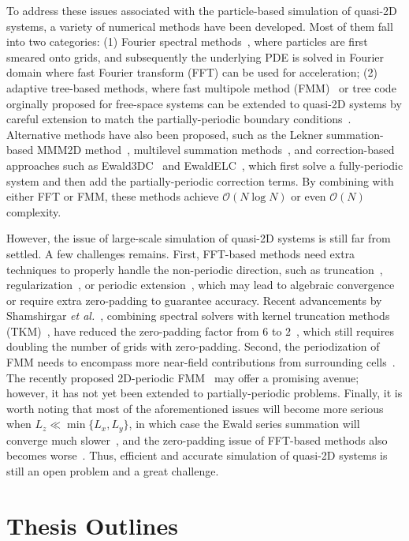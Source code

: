To address these issues associated with the particle-based simulation of quasi-2D systems, a variety of numerical methods have been developed.
Most of them fall into two categories: 
(1) Fourier spectral methods~\cite{lindbo2012fast,nestler2015fast,doi:10.1021/acs.jctc.3c01124, maxian2021fast}, where particles are first smeared onto grids, and subsequently the underlying PDE is solved in Fourier domain where fast Fourier transform (FFT) can be used for acceleration; 
(2) adaptive tree-based methods, where fast multipole method (FMM)~\cite{greengard1987fast} or tree code~\cite{Barnes1986Nature} orginally proposed for free-space systems can be extended to quasi-2D systems by careful extension to match the partially-periodic boundary conditions~\cite{yan2018flexibly,liang2020harmonic}. 
Alternative methods have also been proposed, such as the Lekner summation-based MMM2D method~\cite{arnold2002novel}, multilevel summation methods~\cite{doi:10.1021/ct5009075,greengard2023dual}, and correction-based approaches such as Ewald3DC~\cite{yeh1999ewald} and EwaldELC~\cite{arnold2002electrostatics}, which first solve a fully-periodic system and then add the partially-periodic correction terms. 
By combining with either FFT or FMM, these methods achieve $\mathcal{O}(N\log N)$ or even $\mathcal{O}(N)$ complexity. 

However, the issue of large-scale simulation of quasi-2D systems is still far from settled.
A few challenges remains. First, FFT-based methods need extra techniques to properly handle the non-periodic direction, such as truncation~\cite{parry1975electrostatic}, regularization~\cite{nestler2015fast}, or periodic extension~\cite{lindbo2012fast}, which may lead to algebraic convergence or require extra zero-padding to guarantee accuracy. 
Recent advancements by Shamshirgar \emph{et al.}~\cite{shamshirgar2021fast}, combining spectral solvers with kernel truncation methods (TKM)~\cite{vico2016fast}, have reduced the zero-padding factor from $6$ to $2$~\cite{lindbo2012fast}, which still requires doubling the number of grids with zero-padding. 
Second, the periodization of FMM needs to encompass more near-field contributions from surrounding cells~\cite{yan2018flexibly,barnett2018unified}. The recently proposed 2D-periodic FMM~\cite{PEI2023111792} may offer a promising avenue; however, it has not yet been extended to partially-periodic problems.
Finally, it is worth noting that most of the aforementioned issues will become more serious when $L_z\ll \min\{L_x, L_y\}$, in which case the Ewald series summation will converge much slower~\cite{arnold2002electrostatics}, and the zero-padding issue of FFT-based methods also becomes worse~\cite{maxian2021fast}.
Thus, efficient and accurate simulation of quasi-2D systems is still an open problem and a great challenge.

\section{Thesis Outlines}

